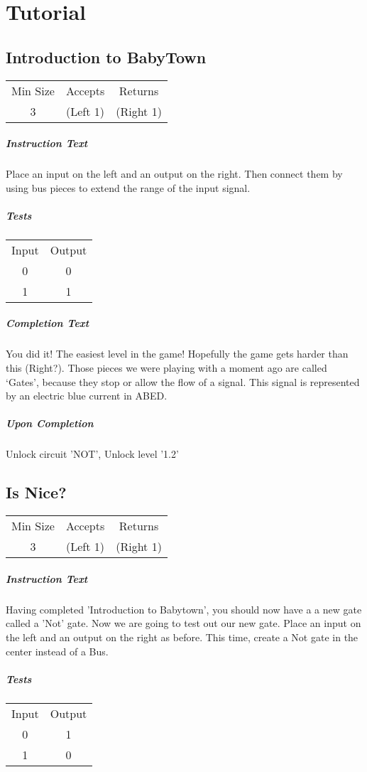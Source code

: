 \documentclass[a4paper, 12pt]{article}
\begin{document}
\tableofcontents
\section{Tutorial}
\subsection{Introduction to BabyTown}
\begin{tabular}{ccc}
	Min Size & Accepts & Returns \\ 
	3 & (Left 1) & (Right 1)
\end{tabular}

\subparagraph{Instruction Text}
Place an input on the left and an output on the right. Then connect them by using bus pieces to extend the range of the input signal.

\subparagraph{Tests}

\begin{tabular}{ c c }
	Input & Output \\ 
	0 & 0 \\  
	1 & 1     
\end{tabular}

\subparagraph{Completion Text}
You did it! The easiest level in the game! Hopefully the game gets harder than this (Right?). Those pieces we were playing with a moment ago are called ‘Gates’, because they stop or allow the flow of a signal. This signal is represented by an electric blue current in ABED.

\subparagraph{Upon Completion}
Unlock circuit 'NOT', Unlock level '1.2'
\subsection{Is Nice?}
\begin{tabular}{ccc}
	Min Size & Accepts & Returns \\ 
	3 & (Left 1) & (Right 1)
\end{tabular}

\subparagraph{Instruction Text}
Having completed 'Introduction to Babytown', you should now have a a new gate called a 'Not' gate. Now we are going to test out our new gate. Place an input on the left and an output on the right as before. This time, create a Not gate in the center instead of a Bus.

\subparagraph{Tests}
\begin{tabular}{ c c }
	Input & Output \\ 
	0 & 1 \\  
	1 & 0     
\end{tabular}
\end{document}
